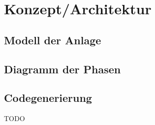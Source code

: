 
\chapter{Konzept/Architektur} \label{chapter:architecture}


\section{Modell der Anlage}
\section{Diagramm der Phasen}
\section{Codegenerierung}


TODO
